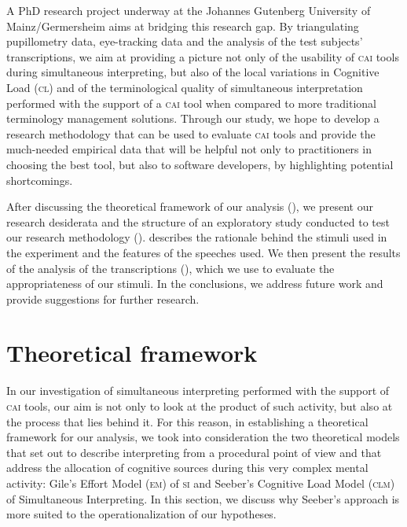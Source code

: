 \documentclass[output=paper]{langsci/langscibook}
\begin{document}
A PhD research project underway at the Johannes Gutenberg University of Mainz\slash Germersheim \citep{Prandi2016, Prandi2017a, Prandi2017b} aims at bridging this research gap. By triangulating pupillometry data, eye-tracking data and the analysis of the test subjects’ transcriptions, we aim at providing a picture not only of the usability of \textsc{cai} tools during simultaneous interpreting, but also of the local variations in Cognitive Load (\textsc{cl}) and of the terminological quality of simultaneous interpretation performed with the support of a \textsc{cai} tool when compared to more traditional terminology management solutions. Through our study, we hope to develop a research methodology that can be used to evaluate \textsc{cai} tools and provide the much-needed empirical data that will be helpful not only to practitioners in choosing the best tool, but also to software developers, by highlighting potential shortcomings.

After discussing the theoretical framework of our analysis (), we present our research desiderata and the structure of an exploratory study conducted to test our research methodology ().  describes the rationale behind the stimuli used in the experiment and the features of the speeches used. We then present the results of the analysis of the transcriptions (), which we use to evaluate the appropriateness of our stimuli. In the conclusions, we address future work and provide suggestions for further research.

\section{Theoretical framework}\label{sec:prandi:2}
In our investigation of simultaneous interpreting performed with the support of \textsc{cai} tools, our aim is not only to look at the product of such activity, but also at the process that lies behind it. For this reason, in establishing a theoretical framework for our analysis, we took into consideration the two theoretical models that set out to describe interpreting from a procedural point of view and that address the allocation of cognitive sources during this very complex mental activity: Gile’s Effort Model (\textsc{em}) of \textsc{si} and Seeber’s Cognitive Load Model (\textsc{clm}) of Simultaneous Interpreting. In this section, we discuss why Seeber’s approach is more suited to the operationalization of our hypotheses.
\end{document}
